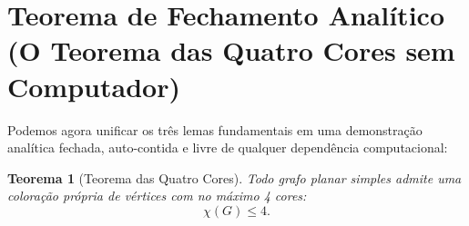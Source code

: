\documentclass[11pt,a4paper]{article}
\theoremstyle{plain}
\newtheorem{theorem}{Teorema}[section]
\theoremstyle{definition}
\begin{document}
\section{Teorema de Fechamento Analítico (O Teorema das Quatro Cores sem Computador)}

Podemos agora unificar os três lemas fundamentais em uma demonstração analítica fechada, auto-contida e livre de qualquer dependência computacional:

\begin{theorem}[Teorema das Quatro Cores]
Todo grafo planar simples admite uma coloração própria de vértices com no máximo 4 cores:
\begin{equation}
\chi(G) \le 4.
\end{equation}
\end{theorem}
\end{document}

